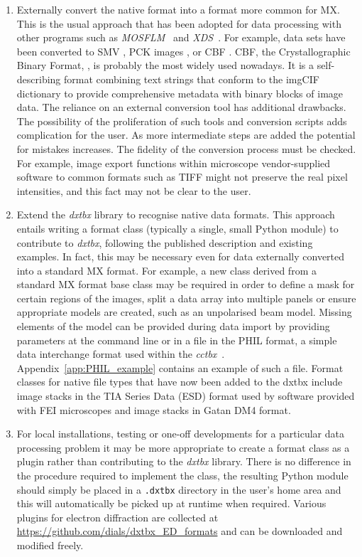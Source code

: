 \documentclass[preprint]{iucr}
\newcommand{\cctbx}{\emph{cctbx}\xspace}
\newcommand{\dxtbx}{\emph{dxtbx}\xspace}
\newcommand{\code}{\texttt}
\newcommand{\xds}{\emph{XDS}\xspace}
\newcommand{\mosflm}{\emph{MOSFLM}\xspace}
\begin{document}
\begin{enumerate}
  \item Externally convert the native format into a format more common for MX.
  This is the usual approach that has been adopted for data processing with
  other programs such as \mosflm~\cite{leslie2007} and
  \xds~\cite{kabsch2010xds}. For example, data sets have been converted to SMV
  \cite{Hattne2015}, PCK images \cite{Clabbers2017}, or CBF
  \cite[\textcolor{red}{Only if it accepted}]{Gruene:2017}.  CBF, the
  Crystallographic Binary Format, \cite{Bernstein2005}, is probably the most
  widely used nowadays. It is a self-describing format combining text strings
  that conform to the imgCIF dictionary to provide comprehensive metadata with
  binary blocks of image data. The reliance on an external conversion tool has
  additional drawbacks.  The possibility of the proliferation of such tools and
  conversion scripts adds complication for the user. As more intermediate steps
  are added the potential for mistakes increases. The fidelity of the conversion
  process must be checked. For example, image export functions within microscope
  vendor-supplied software to common formats such as TIFF might not preserve
  the real pixel intensities, and this fact may not be clear to the user.

  \item Extend the \dxtbx library to recognise native data formats. This
  approach entails writing a format class (typically a single, small Python
  module) to contribute to \dxtbx, following the published description
  \cite{Parkhurst2014} and existing examples. In fact, this may be necessary
  even for data externally converted into a standard MX format. For example, a
  new class derived from a standard MX format base class may be required in
  order to define a mask for certain regions of the images, split a data array
  into multiple panels or ensure appropriate models are created, such as an
  unpolarised beam model. Missing elements of the model can be provided during
  data import by providing parameters at the command line or in a file in the
  PHIL format, a simple data interchange format used within the
  \cctbx~\cite{Grosse-Kunstleve2002}. Appendix~\ref{app:PHIL_example} contains
  an example of such a file. Format classes for native file types that have now
  been added to the dxtbx include image stacks in the TIA Series Data (ESD)
  format used by software provided with FEI microscopes and image stacks in
  Gatan DM4 format.

  \item For local installations, testing or one-off developments for a
  particular data processing problem it may be more appropriate to create a
  format class as a plugin rather than contributing to the \dxtbx library.
  There is no difference in the procedure required to implement the class, the
  resulting Python module should simply be placed in a \code{.dxtbx} directory
  in the user's home area and this will automatically be picked up at runtime
  when required. Various plugins for electron diffraction are collected at
  \url{https://github.com/dials/dxtbx_ED_formats} and can be downloaded and
  modified freely.

\end{enumerate}
\end{document}
